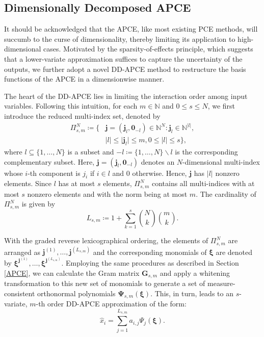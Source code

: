 \documentclass[journal]{IEEEtran}
\theoremstyle{definition}
\theoremstyle{remark}
\begin{document}
\subsection{Dimensionally Decomposed APCE}\label{DD-APCE}
It should be acknowledged that the APCE, like most existing PCE methods, will succumb to the curse of dimensionality, thereby limiting its application to high-dimensional cases. Motivated by the sparsity-of-effects principle, which suggests that a lower-variate approximation suffices to capture the uncertainty of the outputs, we further adopt a novel DD-APCE method \cite{lee2023high} to restructure the basis functions of the APCE in a dimensionwise manner.

The heart of the DD-APCE lies in limiting the interaction order among input variables. Following this intuition, for each $m\in \mathbb{N}$ and $0\leq s\leq N$, we first introduce the reduced multi-index set, denoted by
\begin{equation}\label{eq:19}
    \begin{split}
        \Pi_{s,m}^{N}\coloneqq\{&\boldsymbol{j}=(\boldsymbol{j}_l, \mathbf{0}_{-l})\in\mathbb{N}^N:\boldsymbol{j}_l\in\mathbb{N}^{\vert l\vert}, \\
        &\vert l\vert\leq\vert \boldsymbol{j}_l\vert\leq m, 0\leq\vert l\vert\leq s\},
    \end{split}
\end{equation}
where $l\subseteq\{1,\dots,N\}$ is a subset and $-l\coloneqq\{1,\dots,N\}\backslash l$ is the corresponding complementary subset. Here, $\boldsymbol{j}=(\boldsymbol{j}_l,\mathbf{0}_{-l})$ denotes an $N$-dimensional multi-index whose $i$-th component is $j_i$ if $i\in l$ and 0 otherwise. Hence, $\boldsymbol{j}$ has $\vert l\vert$ nonzero elements. Since $l$ has at most $s$ elements, $\Pi_{s,m}^N$ contains all multi-indices with at most $s$ nonzero elements and with the norm being at most $m$. The cardinality of $\Pi_{s,m}^N$ is given by
\begin{equation}\label{eq:20}
    L_{s,m}\coloneqq 1+\sum\limits_{k=1}^s\binom{N}{k}\binom{m}{k}.
\end{equation}

With the graded reverse lexicographical ordering, the elements of $\Pi_{s,m}^N$ are arranged as $\boldsymbol{j}^{(1)},\dots,\boldsymbol{j}^{(L_{s,m})}$ and the corresponding monomials of $\boldsymbol{\xi}$ are denoted by $\boldsymbol{\xi}^{\boldsymbol{j}^{(1)}},\dots,\boldsymbol{\xi}^{\boldsymbol{j}^{(L_{s,m})}}$. Employing the same procedures as described in Section \ref{APCE}, we can calculate the Gram matrix $\boldsymbol{G}_{s,m}$ and apply a whitening transformation to this new set of monomials to generate a set of measure-consistent orthonormal polynomials $\boldsymbol{\Psi}_{s,m}(\boldsymbol{\xi})$. This, in turn, leads to an $s$-variate, $m$-th order DD-APCE approximation of the form:
\begin{equation}
    \hat{x}_i=\sum\limits_{j=1}^{L_{s,m}}a_{i,j}\Psi_j(\boldsymbol{\xi}).
\end{equation}
\end{document}
